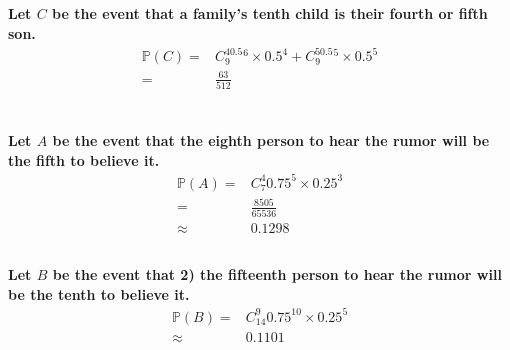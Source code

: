 \documentclass{article}
\begin{document}
        \subsection{}
            \paragraph{
                Let $C$ be the event that a family’s tenth child is their fourth or fifth son.
                \begin{equation*}
                    \begin{split}
                        \mathbb{P}(C)=&C_{9}^40.5^6\times 0.5^4+C_{9}^50.5^5\times 0.5^5\\
                            =&\frac{63}{512}
                    \end{split}
                \end{equation*}
            }
    
    \section{}
        \subsection{}
            \paragraph{
                Let $A$ be the event that the eighth person to hear the rumor will be the fifth to believe it.
                \begin{equation*}
                    \begin{split}
                        \mathbb{P}(A)=&C_{7}^4 0.75^5\times 0.25^3\\
                            =&\frac{8505}{65536}\\
                            \approx&0.1298
                    \end{split}
                \end{equation*}
            }

        \subsection{}
            \paragraph{
                Let $B$ be the event that 2) the fifteenth person to hear the rumor will be the tenth to believe it.
                \begin{equation*}
                    \begin{split}
                        \mathbb{P}(B)=&C_{14}^9 0.75^{10}\times 0.25^5\\
                            \approx&0.1101
                    \end{split}
                \end{equation*}
            }
    
\end{document}
